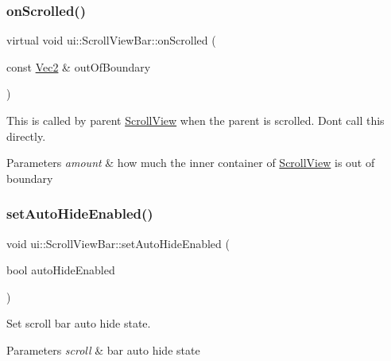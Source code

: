 \subsubsection{\texorpdfstring{on\+Scrolled()}{onScrolled()}\hspace{0.1cm}{\footnotesize\ttfamily [2/2]}}
{\footnotesize\ttfamily virtual void ui\+::\+Scroll\+View\+Bar\+::on\+Scrolled (\begin{DoxyParamCaption}\item[{const \hyperlink{classVec2}{Vec2} \&}]{out\+Of\+Boundary }\end{DoxyParamCaption})\hspace{0.3cm}{\ttfamily [virtual]}}



This is called by parent \hyperlink{classui_1_1ScrollView}{Scroll\+View} when the parent is scrolled. Don\textquotesingle{}t call this directly. 


\begin{DoxyParams}{Parameters}
{\em amount} & how much the inner container of \hyperlink{classui_1_1ScrollView}{Scroll\+View} is out of boundary \\
\hline
\end{DoxyParams}
\mbox{\label{classui_1_1ScrollViewBar_ab46804801caf07a301c0b94c43b05313}} 
\subsubsection{\texorpdfstring{set\+Auto\+Hide\+Enabled()}{setAutoHideEnabled()}\hspace{0.1cm}{\footnotesize\ttfamily [1/2]}}
{\footnotesize\ttfamily void ui\+::\+Scroll\+View\+Bar\+::set\+Auto\+Hide\+Enabled (\begin{DoxyParamCaption}\item[{bool}]{auto\+Hide\+Enabled }\end{DoxyParamCaption})}



Set scroll bar auto hide state. 


\begin{DoxyParams}{Parameters}
{\em scroll} & bar auto hide state \\
\hline
\end{DoxyParams}
\mbox{\label{classui_1_1ScrollViewBar_ab46804801caf07a301c0b94c43b05313}} 
